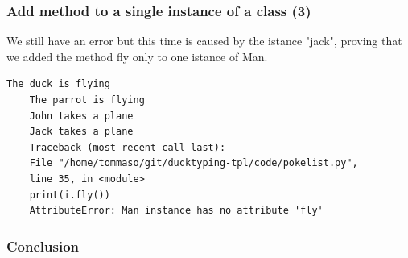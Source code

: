 \documentclass[xcolor ={table,usenames,dvipsnames}]{beamer}
\theoremstyle{definition}
\begin{document}
	\begin{frame}[fragile]
		\frametitle{Add method to a single instance of a class (3)}
			We still have an error but this time is caused by the istance "jack", proving that we added the method fly only to one istance of Man. 
		
		\begin{lstlisting}[keywordstyle=\color{black},
		commentstyle=\color{black},
		stringstyle=\color{black}.]
	The duck is flying
	The parrot is flying
	John takes a plane
	Jack takes a plane
	Traceback (most recent call last):
	File "/home/tommaso/git/ducktyping-tpl/code/pokelist.py",
	line 35, in <module>
	print(i.fly())
	AttributeError: Man instance has no attribute 'fly'
		\end{lstlisting}
	\end{frame}

\begin{frame}
	\frametitle{Conclusion}
\end{frame}

	

		
	
	

	
	
	
	
	
	
	
	
	
	
	
\end{document}
